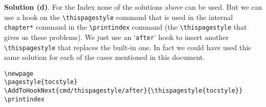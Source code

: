 \documentclass[a4paper,12pt,twoside]{report}
\begin{document}
\bigskip

\begin{boxedminipage}{\textwidth}
\textbf{Solution (d)}. For the Index none of the solutions above can be used. But we can use a hook on the \verb|\thispagestyle| command that is used in the internal \verb|chapter*| command in the \verb|\printindex| command (the \verb|\thispagestyle| that gives us these problems). We just use an `\texttt{after}' hook to insert another \verb|\thispagestyle| that replaces the built-in one. In fact we could have used this same solution for each of the cases mentioned in this document.

\begin{verbatim}
\newpage
\pagestyle{tocstyle}
\AddToHookNext{cmd/thispagestyle/after}{\thispagestyle{tocstyle}}
\printindex
\end{verbatim}
\end{boxedminipage}

\newpage
\pagestyle{tocstyle}
\printindex
\end{document}
